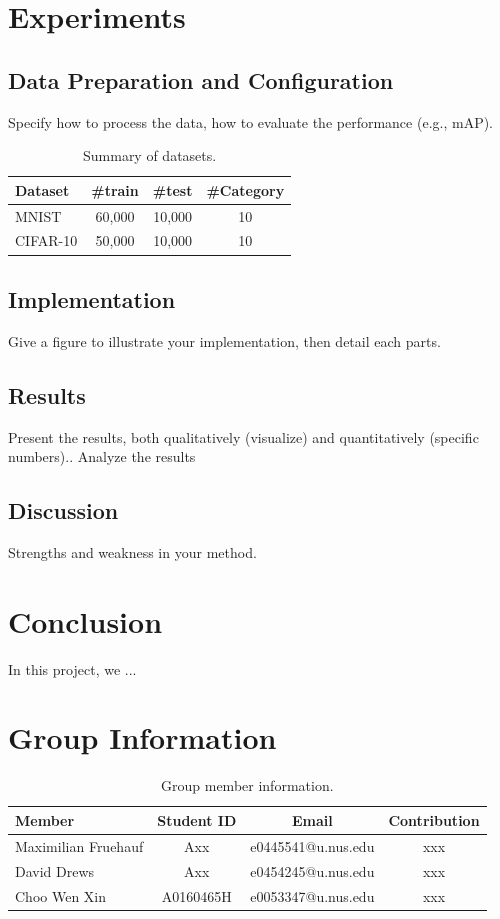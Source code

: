 \documentclass[11pt]{article}
\begin{document}
\section{Experiments}
\subsection{Data Preparation and Configuration}

Specify how to process the data, how to evaluate the performance (e.g., mAP).
\begin{table}[ht]
    \centering
    \begin{tabular}{l|c|c|c}
    \hline
     Dataset & \#train & \#test & \#Category\\
    \hline
    MNIST& 60,000 & 10,000 & 10  \\
    CIFAR-10& 50,000 & 10,000 & 10 \\
    \hline
    \end{tabular}
    \caption{Summary of datasets.}
    \label{tab:dataset}
\end{table}

\subsection{Implementation}
Give a figure to illustrate your implementation, then detail each parts.

\subsection{Results}
Present the results, both qualitatively (visualize) and quantitatively (specific numbers)..
Analyze the results
\subsection{Discussion}
Strengths and weakness in your method.

\section{Conclusion}
In this project, we ...

\section{Group Information}
\begin{table}[ht]
    \centering
    \begin{tabular}{l|c|c|c}
    \hline
     Member & Student ID & Email & Contribution\\
    \hline
    Maximilian Fruehauf& Axx & e0445541@u.nus.edu & xxx \\
    David Drews& Axx &e0454245@u.nus.edu & xxx  \\
    Choo Wen Xin& A0160465H & e0053347@u.nus.edu & xxx  \\
    \hline
    \end{tabular}
    \caption{Group member information.}
    \label{tab:dataset}
\end{table}



 
\end{document}
